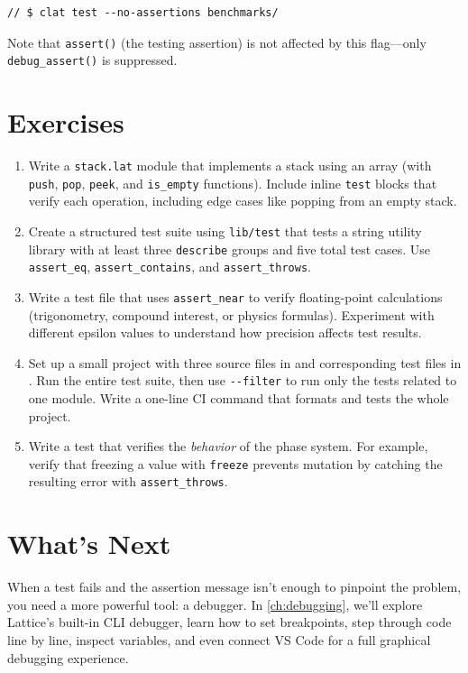 \begin{lstlisting}[language=Lattice, caption={Running without runtime assertions}]
// $ clat test --no-assertions benchmarks/
\end{lstlisting}

Note that \lstinline|assert()| (the testing assertion) is not affected by this flag---only \lstinline|debug_assert()| is suppressed.

\section*{Exercises}\label{sec:testing-exercises}

\begin{enumerate}
  \item Write a \lstinline|stack.lat| module that implements a stack using an array (with \lstinline|push|, \lstinline|pop|, \lstinline|peek|, and \lstinline|is_empty| functions). Include inline \lstinline|test| blocks that verify each operation, including edge cases like popping from an empty stack.

  \item Create a structured test suite using \lstinline|lib/test| that tests a string utility library with at least three \lstinline|describe| groups and five total test cases. Use \lstinline|assert_eq|, \lstinline|assert_contains|, and \lstinline|assert_throws|.

  \item Write a test file that uses \lstinline|assert_near| to verify floating-point calculations (trigonometry, compound interest, or physics formulas). Experiment with different epsilon values to understand how precision affects test results.

  \item Set up a small project with three source files in  and corresponding test files in . Run the entire test suite, then use \lstinline|--filter| to run only the tests related to one module. Write a one-line CI command that formats and tests the whole project.

  \item Write a test that verifies the \emph{behavior} of the phase system. For example, verify that freezing a value with \lstinline|freeze| prevents mutation by catching the resulting error with \lstinline|assert_throws|.
\end{enumerate}

\section*{What's Next}\label{sec:testing-next}

When a test fails and the assertion message isn't enough to pinpoint the problem, you need a more powerful tool: a debugger.
In \cref{ch:debugging}, we'll explore Lattice's built-in CLI debugger, learn how to set breakpoints, step through code line by line, inspect variables, and even connect VS Code for a full graphical debugging experience.
